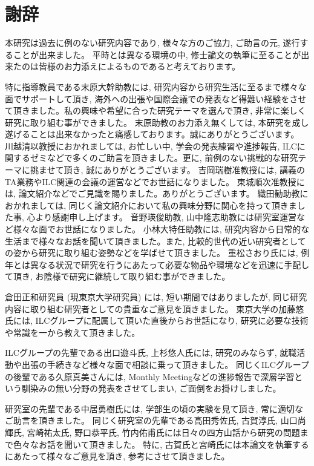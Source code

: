 
\clearpage

\chapter*{謝辞} \label{sec:Acknowledgement}

本研究は過去に例のない研究内容であり, 様々な方のご協力, ご助言の元, 遂行することが出来ました。
平時とは異なる環境の中, 修士論文の執筆に至ることが出来たのは皆様のお力添えによるものであると考えております。

特に指導教員である末原大幹助教には, 研究内容から研究生活に至るまで様々な面でサポートして頂き, 海外への出張や国際会議での発表など得難い経験をさせて頂きました。私の興味や希望に合った研究テーマを選んで頂き, 非常に楽しく研究に取り組む事ができました。
末原助教のお力添え無くしては, 本研究を成し遂げることは出来なかったと痛感しております。誠にありがとうございます。
川越清以教授におかれましては, お忙しい中, 学会の発表練習や進捗報告, ILCに関するゼミなどで多くのご助言を頂きました。更に, 前例のない挑戦的な研究テーマに挑ませて頂き, 誠にありがとうございます。
吉岡瑞樹准教授には, 講義のTA業務やILC関連の会議の運営などでお世話になりました。
東城順次准教授には, 論文紹介などでご見識を賜りました。ありがとうございます。
織田勧助教におかれましては, 同じく論文紹介において私の興味分野に関心を持って頂きました事, 心より感謝申し上げます。
音野瑛俊助教, 山中隆志助教には研究室運営など様々な面でお世話になりました。
小林大特任助教には, 研究内容から日常的な生活まで様々なお話を聞いて頂きました。また, 比較的世代の近い研究者としての姿から研究に取り組む姿勢などを学ばせて頂きました。
重松さおり氏には, 例年とは異なる状況で研究を行うにあたって必要な物品や環境などを迅速に手配して頂き, お陰様で研究に継続して取り組む事ができました。

倉田正和研究員 (現東京大学研究員) には, 短い期間ではありましたが, 同じ研究内容に取り組む研究者としての貴重なご意見を頂きました。
東京大学の加藤悠氏には, ILCグループに配属して頂いた直後からお世話になり, 研究に必要な技術や常識を一から教えて頂きました。

ILCグループの先輩である出口遊斗氏, 上杉悠人氏には, 研究のみならず, 就職活動や出張の手続きなど様々な面で相談に乗って頂きました。
同じくILCグループの後輩である久原真美さんには, Monthly Meetingなどの進捗報告で深層学習という馴染みの無い分野の発表をさせてしまい, ご面倒をお掛けしました。

研究室の先輩である中居勇樹氏には, 学部生の頃の実験を見て頂き, 常に適切なご助言を頂きました。
同じく研究室の先輩である高田秀佐氏, 古賀淳氏, 山口尚輝氏, 宮崎祐太氏, 野口恭平氏, 竹内佑甫氏には日々の四方山話から研究の問題まで色々なお話を聞いて頂きました。
特に, 古賀氏と宮崎氏には本論文を執筆するにあたって様々なご意見を頂き, 参考にさせて頂きました。

